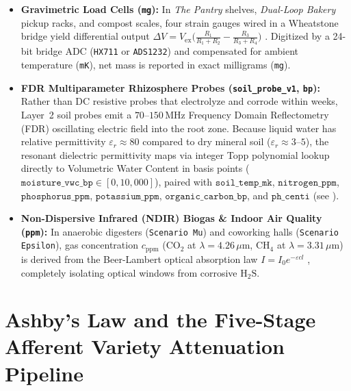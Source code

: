 \begin{itemize}
    \item \textbf{Gravimetric Load Cells (\texttt{mg}):} In \textit{The Pantry} shelves, \textit{Dual-Loop Bakery} pickup racks, and compost scales, four strain gauges wired in a Wheatstone bridge yield differential output $\Delta V = V_{\mathrm{ex}}\bigl(\frac{R_1}{R_1+R_2} - \frac{R_3}{R_3+R_4}\bigr)$ \parencite{fraden2010handbook}. Digitized by a 24-bit bridge ADC (\texttt{HX711} or \texttt{ADS1232}) and compensated for ambient temperature (\texttt{mK}), net mass is reported in exact milligrams (\texttt{mg}).
    \item \textbf{FDR Multiparameter Rhizosphere Probes (\texttt{soil\_probe\_v1}, \texttt{bp}):} Rather than DC resistive probes that electrolyze and corrode within weeks, Layer~2 soil probes emit a $70\text{--}150\,\mathrm{MHz}$ Frequency Domain Reflectometry (FDR) oscillating electric field into the root zone. Because liquid water has relative permittivity $\varepsilon_r \approx 80$ compared to dry mineral soil ($\varepsilon_r \approx 3\text{--}5$), the resonant dielectric permittivity maps via integer Topp polynomial lookup directly to Volumetric Water Content in basis points ($\mathtt{moisture\_vwc\_bp} \in [0, 10{,}000]$), paired with $\mathtt{soil\_temp\_mk}$, $\mathtt{nitrogen\_ppm}$, $\mathtt{phosphorus\_ppm}$, $\mathtt{potassium\_ppm}$, $\mathtt{organic\_carbon\_bp}$, and $\mathtt{ph\_centi}$ (see ).
    \item \textbf{Non-Dispersive Infrared (NDIR) Biogas \& Indoor Air Quality (\texttt{ppm}):} In anaerobic digesters (\texttt{Scenario Mu}) and coworking halls (\texttt{Scenario Epsilon}), gas concentration $c_{\mathrm{ppm}}$ ($\mathrm{CO_2}$ at $\lambda = 4.26\,\mu\mathrm{m}$, $\mathrm{CH_4}$ at $\lambda = 3.31\,\mu\mathrm{m}$) is derived from the Beer-Lambert optical absorption law $I = I_0 e^{-\varepsilon c l}$ \parencite{hodgkinson2013non}, completely isolating optical windows from corrosive $\mathrm{H_2S}$.
\end{itemize}

\section{Ashby's Law and the Five-Stage Afferent Variety Attenuation Pipeline}
\label{sec:l2-variety-attenuation}

